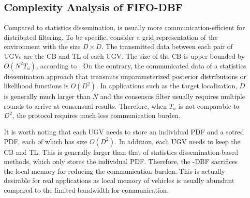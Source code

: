 	\subsection{Complexity Analysis of FIFO-DBF}\label{subsec:complexity}
	Compared to statistics dissemination, {\proto} is usually more communication-efficient for distributed filtering. 
	To be specific, consider a grid representation of the environment with the size $D\times D$. %
	The transmitted data between each pair of UGVs are the CB and TL of each UGV.
	The size of the CB is upper bounded by $O(N^2T_u)$, according to .
	On the contrary, the communicated data of a statistics dissemination approach that transmits unparameterized posterior distributions or likelihood functions is $O(D^2)$.
	In applications such as the target localization, $D$ is generally much larger than $N$ and the consensus filter usually requires multiple rounds to arrive at consensual results.
	Therefore, when $T_u$ is not comparable to $D^2$, the {\proto} protocol requires much less communication burden.
	
	It is worth noting that each UGV needs to store an individual PDF and a sotred PDF, each of which has size $O(D^2)$. 
	In addition, each UGV needs to keep the CB and TL.
	This is generally larger than that of statistics dissemination-based methods, which only stores the individual PDF.
	Therefore, the \proto-DBF sacrifices the local memory for reducing the communication burden. 
	This is actually desirable for real applications as local memory of vehicles is usually abundant compared to the limited bandwidth for communication.
	

